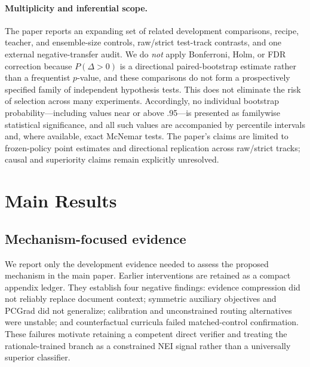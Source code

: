 \documentclass[11pt]{article}
\begin{document}
\paragraph{Multiplicity and inferential scope.}
The paper reports an expanding set of related development comparisons, recipe, teacher, and ensemble-size controls, raw/strict test-track contrasts, and one external negative-transfer audit. We do \emph{not} apply Bonferroni, Holm, or FDR correction because $P(\Delta>0)$ is a directional paired-bootstrap estimate rather than a frequentist $p$-value, and these comparisons do not form a prospectively specified family of independent hypothesis tests. This does not eliminate the risk of selection across many experiments. Accordingly, no individual bootstrap probability---including values near or above .95---is presented as familywise statistical significance, and all such values are accompanied by percentile intervals and, where available, exact McNemar tests. The paper's claims are limited to frozen-policy point estimates and directional replication across raw/strict tracks; causal and superiority claims remain explicitly unresolved.

\section{Main Results}
\subsection{Mechanism-focused evidence}
We report only the development evidence needed to assess the proposed mechanism in the main paper. Earlier interventions are retained as a compact appendix ledger. They establish four negative findings: evidence compression did not reliably replace document context; symmetric auxiliary objectives and PCGrad did not generalize; calibration and unconstrained routing alternatives were unstable; and counterfactual curricula failed matched-control confirmation. These failures motivate retaining a competent direct verifier and treating the rationale-trained branch as a constrained \textsc{NEI} signal rather than a universally superior classifier.
\end{document}
